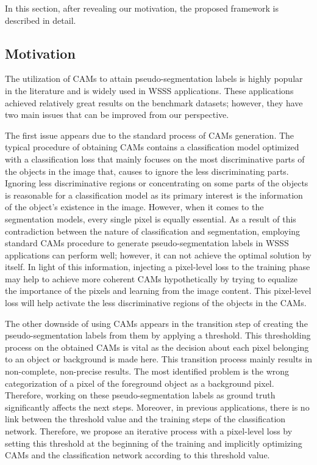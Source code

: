 \documentclass[sn-mathphys]{sn-jnl}
\theoremstyle{thmstyleone}
\theoremstyle{thmstyletwo}\newtheorem{example}{Example}\newtheorem{remark}{Remark}
\theoremstyle{thmstylethree}\newtheorem{definition}{Definition}
\begin{document}
In this section, after revealing our motivation, the proposed framework is described in detail.

\subsection{Motivation}\label{motivation}





The utilization of CAMs to attain pseudo-segmentation labels is highly popular in the literature and is widely used in WSSS applications. These applications achieved relatively great results on the benchmark datasets; however, they have two main issues that can be improved from our perspective. 

The first issue appears due to the standard process of CAMs generation. The typical procedure of obtaining CAMs contains a classification model optimized with a classification loss that mainly focuses on the most discriminative parts of the objects in the image that, causes to ignore the less discriminating parts. Ignoring less discriminative regions or concentrating on some parts of the objects is reasonable for a classification model as its primary interest is the information of the object's existence in the image. However, when it comes to the segmentation models, every single pixel is equally essential. As a result of this contradiction between the nature of classification and segmentation, employing standard CAMs procedure to generate pseudo-segmentation labels in WSSS applications can perform well; however, it can not achieve the optimal solution by itself. In light of this information, injecting a pixel-level loss to the training phase may help to achieve more coherent CAMs hypothetically by trying to equalize the importance of the pixels and learning from the image content. This pixel-level loss will help activate the less discriminative regions of the objects in the CAMs. 

The other downside of using CAMs appears in the transition step of creating the pseudo-segmentation labels from them by applying a threshold. This thresholding process on the obtained CAMs is vital as the decision about each pixel belonging to an object or background is made here. This transition process mainly results in non-complete, non-precise results. The most identified problem is the wrong categorization of a pixel of the foreground object as a background pixel. Therefore, working on these pseudo-segmentation labels as ground truth significantly affects the next steps. Moreover, in previous applications, there is no link between the threshold value and the training steps of the classification network. Therefore, we propose an iterative process with a pixel-level loss by setting this threshold at the beginning of the training and implicitly optimizing CAMs and the classification network according to this threshold value.
\end{document}
